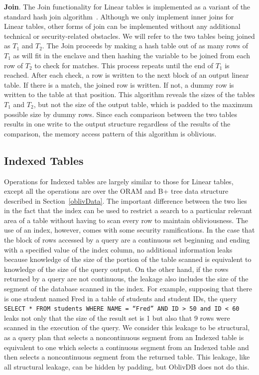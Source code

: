 \documentclass[letterpaper,twocolumn,10pt]{article}
\def\name/{OblivDB}
\begin{document}
  \noindent \textbf{Join}. 
The Join functionality for Linear tables is implemented as a variant of the standard hash join algorithm~\cite{EN10}. Although we only implement inner joins for Linear tables, other forms of join can be implemented without any additional technical or security-related obstacles. We will refer to the two tables being joined as $T_1$ and $T_2$. The Join proceeds by making a hash table out of as many rows of $T_1$ as will fit in the enclave and then hashing the variable to be joined from each row of $T_2$ to check for matches. This process repeats until the end of $T_1$ is reached. After each check, a row is written to the next block of an output linear table. If there is a match, the joined row is written. If not, a dummy row is written to the table at that position. This algorithm reveals the sizes of the tables $T_1$ and $T_2$, but not the size of the output table, which is padded to the maximum possible size by dummy rows. Since each comparison between the two tables results in one write to the output structure regardless of the results of the comparison, the memory access pattern of this algorithm is oblivious. 

\subsection{Indexed Tables}

Operations for Indexed tables are largely similar to those for Linear tables, except all the operations are over the ORAM and B+ tree data structure described in Section~\ref{oblivData}. The important difference between the two lies in the fact that the index can be used to restrict a search to a particular relevant area of a table without having to scan every row to maintain obliviousness. The use of an index, however, comes with some security ramifications. In the case that the block of rows accessed by a query are a continuous set beginning and ending with a specified value of the index column, no additional information leaks because knowledge of the size of the portion of the table scanned is equivalent to knowledge of the size of the query output. On the other hand, if the rows returned by a query are not continuous, the leakage also includes the size of the segment of the database scanned in the index. For example, supposing that there is one student named Fred in a table of students and student IDs,  the query \texttt{SELECT * FROM students WHERE NAME = ``Fred'' AND ID > 50 and ID < 60} leaks not only that the size of the result set is 1 but also that 9 rows were scanned in the execution of the query. We consider this leakage to be structural, as a query plan that selects a noncontinuous segment from an Indexed table is equivalent to one which selects a continuous segment from an Indexed table and then selects a noncontinuous segment from the returned table. This leakage, like all structural leakage, can be hidden by padding, but \name/ does not do this. 
\end{document}

